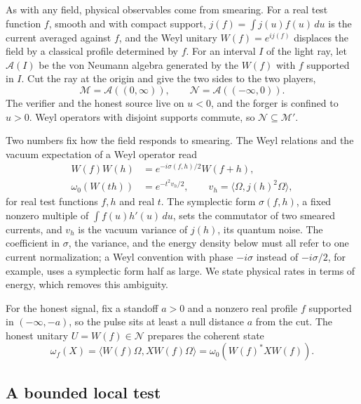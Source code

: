 \documentclass[11pt,a4paper]{article}
\newcommand{\M}{\mathcal{M}}
\newcommand{\N}{\mathcal{N}}
\newcommand{\A}{\mathcal{A}}
\begin{document}
As with any field, physical observables come from smearing. For a real test function $f$, smooth and with compact support, $j(f)=\int j(u)f(u)\,du$ is the current averaged against $f$, and the Weyl unitary $W(f)=e^{ij(f)}$ displaces the field by a classical profile determined by $f$. For an interval $I$ of the light ray, let $\A(I)$ be the von Neumann algebra generated by the $W(f)$ with $f$ supported in $I$. Cut the ray at the origin and give the two sides to the two players,
\begin{equation}
\M=\A((0,\infty)),
\qquad
\N=\A((-\infty,0)).
\label{eq:halflines}
\end{equation}
The verifier and the honest source live on $u<0$, and the forger is confined to $u>0$. Weyl operators with disjoint supports commute, so $\N\subseteq\M'$.

Two numbers fix how the field responds to smearing. The Weyl relations and the vacuum expectation of a Weyl operator read
\begin{align}
W(f)W(h)&=e^{-i\sigma(f,h)/2}W(f+h),\label{eq:symplectic}\\
\omega_0(W(th))&=e^{-t^2v_h/2},\qquad
v_h=\langle\Omega,j(h)^2\Omega\rangle,
\label{eq:vacuum-characteristic}
\end{align}
for real test functions $f,h$ and real $t$. The symplectic form $\sigma(f,h)$, a fixed nonzero multiple of $\int f(u)h'(u)\,du$, sets the commutator of two smeared currents, and $v_h$ is the vacuum variance of $j(h)$, its quantum noise. The coefficient in $\sigma$, the variance, and the energy density below must all refer to one current normalization; a Weyl convention with phase $-i\sigma$ instead of $-i\sigma/2$, for example, uses a symplectic form half as large. We state physical rates in terms of energy, which removes this ambiguity.

For the honest signal, fix a standoff $a>0$ and a nonzero real profile $f$ supported in $(-\infty,-a)$, so the pulse sits at least a null distance $a$ from the cut. The honest unitary $U=W(f)\in\N$ prepares the coherent state
\begin{equation}
\omega_f(X)
=\langle W(f)\Omega,XW(f)\Omega\rangle
=\omega_0(W(f)^*XW(f)).
\label{eq:coherent-state}
\end{equation}

\subsection{A bounded local test}
\end{document}
